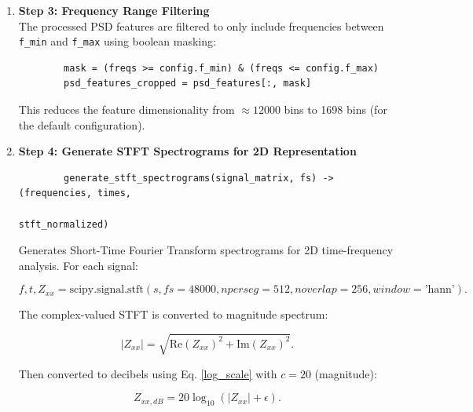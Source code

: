 \begin{enumerate}
    \begin{equation}\label{psd_clipped}
        P_{xx,\text{clipped}} = \text{clip}(P_{xx, \text{norm}}, -120, 0).
    \end{equation}

    \item \textbf{Step 3: Frequency Range Filtering} \\
    The processed PSD features are filtered to only include frequencies between \verb|f_min| and \verb|f_max| 
    using boolean masking:

    \begin{verbatim}
        mask = (freqs >= config.f_min) & (freqs <= config.f_max)
        psd_features_cropped = psd_features[:, mask]
    \end{verbatim}

    This reduces the feature dimensionality from $\approx 12000$ bins to 1698 
    bins (for the default configuration). 

    \item \textbf{Step 4: Generate STFT Spectrograms for 2D Representation} \\
    \begin{verbatim}
        generate_stft_spectrograms(signal_matrix, fs) -> (frequencies, times, 
                                                            stft_normalized)
    \end{verbatim}

    Generates Short-Time Fourier Transform spectrograms for 2D time-frequency analysis. For each signal:

    \begin{equation}\label{stft}
        f, t, Z_{xx} = \text{scipy.signal.stft}(s, fs=48000, nperseg=512, noverlap=256, window=\text{'hann'}).
    \end{equation}

    The complex-valued STFT is converted to magnitude spectrum:

    \begin{equation}\label{stft_mag}
        |Z_{xx}| = \sqrt{\text{Re}(Z_{xx})^2 + \text{Im}(Z_{xx})^2}.
    \end{equation}

    Then converted to decibels using Eq. \eqref{log_scale} with $c=20$ (magnitude):

    \begin{equation}\label{stft_db}
        Z_{xx,dB} = 20 \log_{10}(|Z_{xx}| + \epsilon).
    \end{equation}


\end{enumerate}
